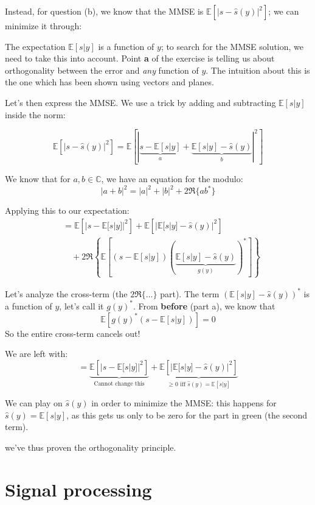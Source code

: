 \documentclass[a4paper, 12pt]{book}
\begin{document}
Instead, for question (b), we know that the MMSE is $\mathbb{E}[|s - \hat{s}(y)|^2]$; we can minimize it through:

\clearpage %

The expectation $\mathbb{E}[s|y]$ is a function of $y$; to search for the MMSE solution, we need to take this into account.
Point \textbf{a} of the exercise is telling us about orthogonality between the error and \textit{any} function of $y$.
The intuition about this is the one which has been shown using vectors and planes.

Let's then express the MMSE. We use a trick by adding and subtracting $\mathbb{E}[s|y]$ inside the norm:

$$
\mathbb{E}\left[ |s - \hat{s}(y)|^2 \right] = \mathbb{E}\left[ | \underbrace{s - \mathbb{E}[s|y]}_{a} + \underbrace{\mathbb{E}[s|y] - \hat{s}(y)}_{b} |^2 \right]
$$

We know that for $a, b \in \mathbb{C}$, we have an equation for the modulo:
$$
|a+b|^2 = |a|^2 + |b|^2 + 2\Re\{ab^*\}
$$

Applying this to our expectation:
\begin{align*}
&= \mathbb{E}\left[ |s - \mathbb{E}[s|y]|^2 \right] + \mathbb{E}\left[ |\mathbb{E}[s|y] - \hat{s}(y)|^2 \right] \\
&\quad + 2\Re\left\{ \mathbb{E}\left[ (s - \mathbb{E}[s|y])(\underbrace{\mathbb{E}[s|y] - \hat{s}(y)}_{g(y)})^* \right] \right\}
\end{align*}

Let's analyze the cross-term (the $2\Re\{\dots\}$ part). The term $(\mathbb{E}[s|y] - \hat{s}(y))^*$ is a function of $y$, let's call it $g(y)^*$.
From \textbf{before} (part a), we know that
$$
\mathbb{E}[g(y)^*(s - \mathbb{E}[s|y])] = 0
$$
So the entire cross-term cancels out!

We are left with:
$$
= \underbrace{\mathbb{E}\left[ |s - \mathbb{E}[s|y]|^2 \right]}_{\text{Cannot change this}} + \underbrace{\mathbb{E}\left[ |\mathbb{E}[s|y] - \hat{s}(y)|^2 \right]}_{\ge 0 \text{ iff } \hat{s}(y) = \mathbb{E}[s|y]}
$$

We can play on $\hat{s}(y)$ in order to minimize the MMSE: this happens for $\hat{s}(y) = \mathbb{E}[s|y]$, as this gets us only to be zero for the part in green (the second term).

we've thus proven the orthogonality principle.

\section{Signal processing}
\end{document}
